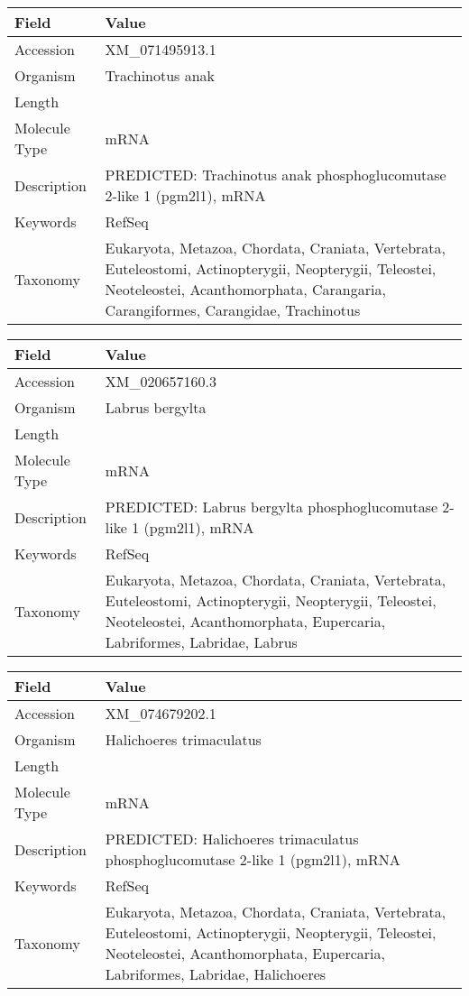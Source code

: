 \documentclass[10pt]{article}
\begin{document}
{\footnotesize
\begin{longtable}{>{\raggedright\arraybackslash}p{4.5cm} >{\raggedright\arraybackslash}p{11.5cm}}
\textbf{Field} & \textbf{Value} \\
\hline
Accession & XM\_071495913.1 \\
Organism & Trachinotus anak \\
Length & 4165 \\
Molecule Type & mRNA \\
Description & PREDICTED: Trachinotus anak phosphoglucomutase 2-like 1 (pgm2l1), mRNA \\
Keywords & RefSeq \\
Taxonomy & Eukaryota, Metazoa, Chordata, Craniata, Vertebrata, Euteleostomi, Actinopterygii, Neopterygii, Teleostei, Neoteleostei, Acanthomorphata, Carangaria, Carangiformes, Carangidae, Trachinotus \\
\end{longtable}
}

{\footnotesize
\begin{longtable}{>{\raggedright\arraybackslash}p{4.5cm} >{\raggedright\arraybackslash}p{11.5cm}}
\textbf{Field} & \textbf{Value} \\
\hline
Accession & XM\_020657160.3 \\
Organism & Labrus bergylta \\
Length & 2495 \\
Molecule Type & mRNA \\
Description & PREDICTED: Labrus bergylta phosphoglucomutase 2-like 1 (pgm2l1), mRNA \\
Keywords & RefSeq \\
Taxonomy & Eukaryota, Metazoa, Chordata, Craniata, Vertebrata, Euteleostomi, Actinopterygii, Neopterygii, Teleostei, Neoteleostei, Acanthomorphata, Eupercaria, Labriformes, Labridae, Labrus \\
\end{longtable}
}

{\footnotesize
\begin{longtable}{>{\raggedright\arraybackslash}p{4.5cm} >{\raggedright\arraybackslash}p{11.5cm}}
\textbf{Field} & \textbf{Value} \\
\hline
Accession & XM\_074679202.1 \\
Organism & Halichoeres trimaculatus \\
Length & 3369 \\
Molecule Type & mRNA \\
Description & PREDICTED: Halichoeres trimaculatus phosphoglucomutase 2-like 1 (pgm2l1), mRNA \\
Keywords & RefSeq \\
Taxonomy & Eukaryota, Metazoa, Chordata, Craniata, Vertebrata, Euteleostomi, Actinopterygii, Neopterygii, Teleostei, Neoteleostei, Acanthomorphata, Eupercaria, Labriformes, Labridae, Halichoeres \\
\end{longtable}
}
\end{document}

